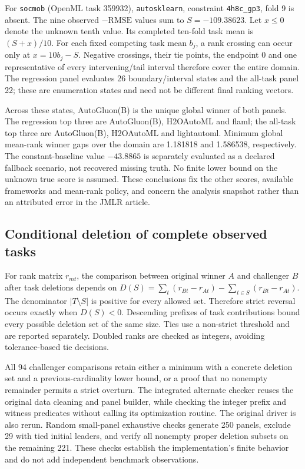 For \texttt{socmob} (OpenML task 359932), \texttt{autosklearn}, constraint \texttt{4h8c\_gp3}, fold 9 is absent. The nine observed $-\mathrm{RMSE}$ values sum to $S=-109.38623$. Let $x\le0$ denote the unknown tenth value. Its completed ten-fold task mean is $(S+x)/10$. For each fixed competing task mean $b_j$, a rank crossing can occur only at $x=10b_j-S$. Negative crossings, their tie points, the endpoint $0$ and one representative of every intervening/tail interval therefore cover the entire domain. The regression panel evaluates 26 boundary/interval states and the all-task panel 22; these are enumeration states and need not be different final ranking vectors.

Across these states, AutoGluon(B) is the unique global winner of both panels. The regression top three are AutoGluon(B), H2OAutoML and flaml; the all-task top three are AutoGluon(B), H2OAutoML and lightautoml. Minimum global mean-rank winner gaps over the domain are 1.181818 and 1.586538, respectively. The constant-baseline value $-43.8865$ is separately evaluated as a declared fallback scenario, not recovered missing truth. No finite lower bound on the unknown true score is assumed. These conclusions fix the other scores, available frameworks and mean-rank policy, and concern the analysis snapshot rather than an attributed error in the JMLR article.

\subsection{Conditional deletion of complete observed tasks}
For rank matrix $r_{mt}$, the comparison between original winner $A$ and challenger $B$ after task deletions depends on $D(S)=\sum_t(r_{Bt}-r_{At})-\sum_{t\in S}(r_{Bt}-r_{At})$. The denominator $|T\setminus S|$ is positive for every allowed set. Therefore strict reversal occurs exactly when $D(S)<0$. Descending prefixes of task contributions bound every possible deletion set of the same size. Ties use a non-strict threshold and are reported separately. Doubled ranks are checked as integers, avoiding tolerance-based tie decisions.



All 94 challenger comparisons retain either a minimum with a concrete deletion set and a previous-cardinality lower bound, or a proof that no nonempty remainder permits a strict overturn. The integrated alternate checker reuses the original data cleaning and panel builder, while checking the integer prefix and witness predicates without calling its optimization routine. The original driver is also rerun. Random small-panel exhaustive checks generate 250 panels, exclude 29 with tied initial leaders, and verify all nonempty proper deletion subsets on the remaining 221. These checks establish the implementation's finite behavior and do not add independent benchmark observations.

